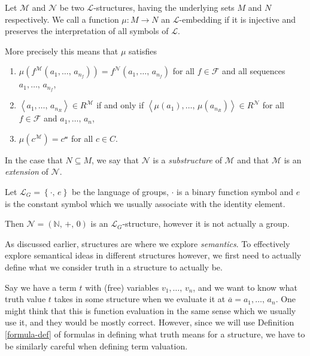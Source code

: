 \documentclass[../../main.tex]{subfiles}
\begin{document}
\begin{definition}\label{structure-embedding-def}\cite[Definition 1.1.3]{Mar02}
    Let $\mathcal{M}$ and $\mathcal{N}$ be two $\mathcal{L}$-structures, having the underlying sets $M$ and $N$ respectively.
    We call a function $\mu: M \to N$ an $\mathcal{L}$-embedding if it is injective and preserves the interpretation of all symbols of $\mathcal{L}$.

    More precisely this means that $\mu$ satisfies
    \begin{enumerate}[label=(\roman*)]
        \item $\mu\left(f^\mathcal{M}(a_1,\ldots,\, a_{n_f})\right) = f^\mathcal{N}(a_1,\ldots,\, a_{n_f})$ 
        for all $f \in \mathcal{F}$ and all sequences $a_1,\ldots,\, a_{n_f}$,
        \item $\left<a_1,\ldots,\, a_{n_R}\right> \in R^\mathcal{M}$ if and only if $\left<\mu(a_1),\ldots,\, \mu(a_{n_R})\right> \in R^\mathcal{N}$ 
        for all $f \in \mathcal{F}$ and $a_1,\ldots,\, a_n$,
        \item $\mu(c^\mathcal{M}) = c^\mathcal{n}$ for all $c \in C$.
    \end{enumerate}
    In the case that $N \subseteq M$, 
    we say that $\mathcal{N}$ is a \textit{substructure} of $\mathcal{M}$ and that $\mathcal{M}$ is an \textit{extension} of $\mathcal{N}$.
\end{definition}

\begin{example}\cite[p.8]{Mar02}
    Let $\mathcal{L}_G = \left\{\cdot,\, e\right\}$ be the language of groups, 
    $\cdot$ is a binary function symbol and $e$ is the constant symbol which we usually associate with the identity element.

    Then $\mathcal{N} = \left(\mathbb{N},\, +,\, 0\right)$ is an $\mathcal{L}_G$-structure, however it is not actually a group.
\end{example}

As discussed earlier, structures are where we explore \textit{semantics}.
To effectively explore semantical ideas in different structures however, 
we first need to actually define what we consider truth in a structure to actually be.

Say we have a term $t$ with (free) variables $v_1,\ldots,\, v_n$,
and we want to know what truth value $t$ takes in some structure when we evaluate it at $\overline{a} = a_1,\ldots,\, a_n$.
One might think that this is function evaluation in the same sense which we usually use it, and they would be mostly correct.
However, since we will use Definition \ref{formula-def} of formulas in defining what truth means for a structure,
we have to be similarly careful when defining term valuation.
\end{document}
